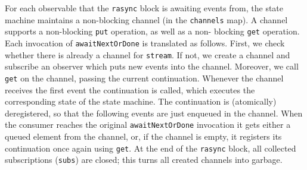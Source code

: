 \documentclass{acm_proc_article-sp}
\begin{document}
For each observable that the \verb|rasync| block is awaiting events from, the
state machine maintains a non-blocking channel (in the \verb|channels| map). A
channel supports a non-blocking \verb|put| operation, as well as a non-
blocking \verb|get| operation. Each invocation of \verb|awaitNextOrDone| is
translated as follows. First, we check whether there is already a channel for
\verb|stream|. If not, we create a channel and subscribe an observer which puts
new events into the channel. Moreover, we call \verb|get| on the channel,
passing the current continuation. Whenever the channel receives the first
event the continuation is called, which executes the corresponding state of
the state machine. The continuation is (atomically) deregistered, so
that the following events are just enqueued in the channel. When the consumer
reaches the original \verb|awaitNextOrDone| invocation it gets either a queued
element from the channel, or, if the channel is empty, it registers its
continuation once again using \verb|get|. At the end of the \verb|rasync|
block, all collected subscriptions (\verb|subs|) are closed; this turns all
created channels into garbage.
\end{document}
